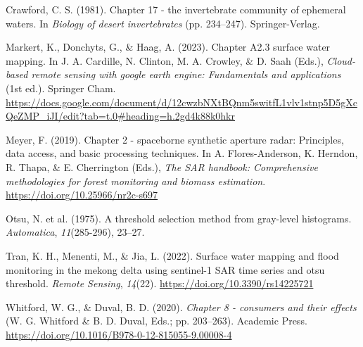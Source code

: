 \documentclass[
]{agujournal2019}
\newlength{\cslhangindent}
\newenvironment{CSLReferences}[2] %
 {\begin{list}{}{%
  \setlength{\itemindent}{0pt}
  \setlength{\leftmargin}{0pt}
  \setlength{\parsep}{0pt}
  \ifodd #1
   \setlength{\leftmargin}{\cslhangindent}
   \setlength{\itemindent}{-1\cslhangindent}
  \fi
  \setlength{\itemsep}{#2\baselineskip}}}
 {\end{list}}
\begin{document}
\label{refs}
\begin{CSLReferences}{1}{0}
\vspace{1em}

Crawford, C. S. (1981). Chapter 17 - the invertebrate community of
ephemeral waters. In \emph{Biology of desert invertebrates} (pp.
234--247). Springer-Verlag.

Markert, K., Donchyts, G., \& Haag, A. (2023). Chapter A2.3 surface
water mapping. In J. A. Cardille, N. Clinton, M. A. Crowley, \& D. Saah
(Eds.), \emph{Cloud-based remote sensing with google earth engine:
Fundamentals and applications} (1st ed.). Springer Cham.
\url{https://docs.google.com/document/d/12cwzbNXtBQnm5switfL1vlv1stnp5D5gXcQeZMP_iJI/edit?tab=t.0\#heading=h.2gd4k88k0hkr}

Meyer, F. (2019). Chapter 2 - spaceborne synthetic aperture radar:
Principles, data access, and basic processing techniques. In A.
Flores-Anderson, K. Herndon, R. Thapa, \& E. Cherrington (Eds.),
\emph{The SAR handbook: Comprehensive methodologies for forest
monitoring and biomass estimation}.
\url{https://doi.org/10.25966/nr2c-s697}

Otsu, N. et al. (1975). A threshold selection method from gray-level
histograms. \emph{Automatica}, \emph{11}(285-296), 23--27.

Tran, K. H., Menenti, M., \& Jia, L. (2022). Surface water mapping and
flood monitoring in the mekong delta using sentinel-1 SAR time series
and otsu threshold. \emph{Remote Sensing}, \emph{14}(22).
\url{https://doi.org/10.3390/rs14225721}

Whitford, W. G., \& Duval, B. D. (2020). \emph{Chapter 8 - consumers and
their effects} (W. G. Whitford \& B. D. Duval, Eds.; pp. 203--263).
Academic Press. \url{https://doi.org/10.1016/B978-0-12-815055-9.00008-4}

\end{CSLReferences}
\end{document}
